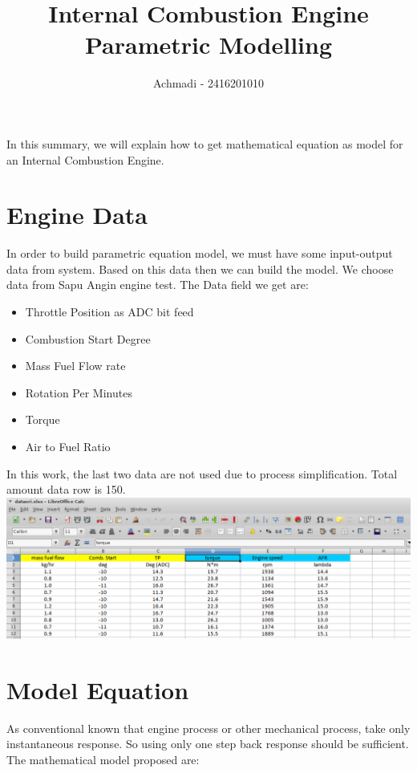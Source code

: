 \documentclass{article}
\begin{document}
\title{Internal Combustion Engine Parametric Modelling}
\author{Achmadi - 2416201010}
\date{\vspace{-5ex}}

\maketitle


In this summary, we will explain how to get mathematical equation as model for an Internal Combustion Engine.

\section{Engine Data}

In order to build parametric equation model, we must have some input-output data from system.
Based on this data then we can build the model.
We choose data from Sapu Angin engine test.
The Data field we get are:
\begin{itemize}
	\item Throttle Position as ADC bit feed
	\item Combustion Start Degree
	\item Mass Fuel Flow rate
	\item Rotation Per Minutes
	\item Torque
	\item Air to Fuel Ratio
\end{itemize} 

In this work, the last two data are not used due to process simplification.
Total amount data row is 150.\\
\includegraphics[width=500pt]{data}\\

\section{Model Equation}
As conventional known that engine process or other mechanical process, take only instantaneous response.
So using only one step back response should be sufficient.
The mathematical model proposed are:\\
\end{document}
